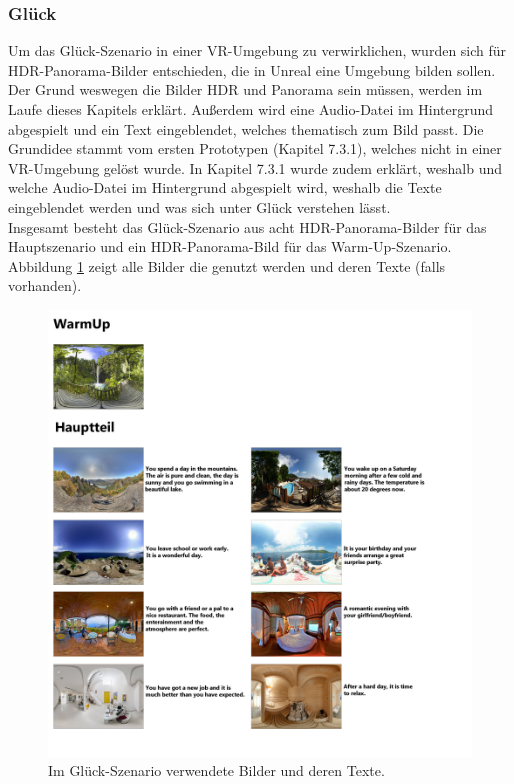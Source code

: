 \subsubsection{Glück} \label{glueck-4}







Um das Glück-Szenario in einer VR-Umgebung zu verwirklichen, wurden sich für HDR-Panorama-Bilder entschieden, die in Unreal eine Umgebung bilden sollen. 
Der Grund weswegen die Bilder HDR und Panorama sein müssen, werden im Laufe dieses Kapitels erklärt. 
Außerdem wird eine Audio-Datei im Hintergrund abgespielt und ein Text eingeblendet, welches thematisch zum Bild passt. 
Die Grundidee stammt vom ersten Prototypen (Kapitel 7.3.1), welches nicht in einer VR-Umgebung gelöst wurde. 
In Kapitel 7.3.1 wurde zudem erklärt, weshalb und welche Audio-Datei im Hintergrund abgespielt wird, weshalb die Texte eingeblendet werden und was sich unter Glück verstehen lässt. \\

Insgesamt besteht das Glück-Szenario aus acht HDR-Panorama-Bilder für das Hauptszenario und ein HDR-Panorama-Bild für das Warm-Up-Szenario. 
Abbildung \ref{fig-glueck4} zeigt alle Bilder die genutzt werden und deren Texte (falls vorhanden). \\

\begin{figure}[H] \centering
\includegraphics[width=15cm]{Images/gluck4.png} 
\vspace{-0.3cm} 
\caption[Im Glück-Szenario verwendete Bilder und deren Texte]{Im Glück-Szenario verwendete Bilder und deren Texte\cite{sun360}.}
\label{fig-glueck4} 
\end{figure}


